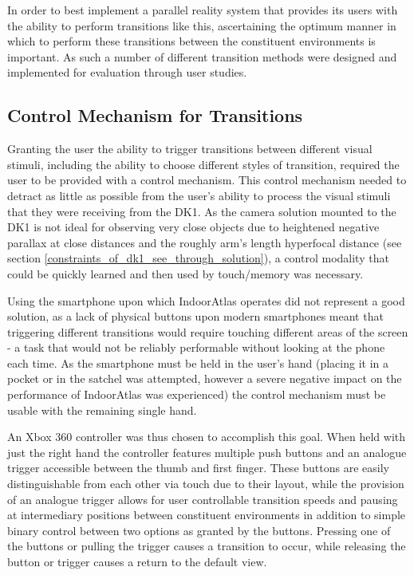 In order to best implement a parallel reality system that provides its users with the ability to perform transitions like this, ascertaining the optimum manner in which to perform these transitions between the constituent environments is important. As such a number of different transition methods were designed and implemented for evaluation through user studies.


\subsection{Control Mechanism for Transitions}

Granting the user the ability to trigger transitions between different visual stimuli, including the ability to choose different styles of transition, required the user to be provided with a control mechanism. This control mechanism needed to detract as little as possible from the user's ability to process the visual stimuli that they were receiving from the DK1. As the camera solution mounted to the DK1 is not ideal for observing very close objects due to heightened negative parallax at close distances and the roughly arm's length hyperfocal distance (see section \ref{constraints_of_dk1_see_through_solution}), a control modality that could be quickly learned and then used by touch/memory was necessary.

Using the smartphone upon which IndoorAtlas operates did not represent a good solution, as a lack of physical buttons upon modern smartphones meant that triggering different transitions would require touching different areas of the screen - a task that would not be reliably performable without looking at the phone each time. As the smartphone must be held in the user's hand (placing it in a pocket or in the satchel was attempted, however a severe negative impact on the performance of IndoorAtlas was experienced) the control mechanism must be usable with the remaining single hand.

An Xbox 360 controller was thus chosen to accomplish this goal. When held with just the right hand the controller features multiple push buttons and an analogue trigger accessible between the thumb and first finger. These buttons are easily distinguishable from each other via touch due to their layout, while the provision of an analogue trigger allows for user controllable transition speeds and pausing at intermediary positions between constituent environments in addition to simple binary control between two options as granted by the buttons. Pressing one of the buttons or pulling the trigger causes a transition to occur, while releasing the button or trigger causes a return to the default view.

